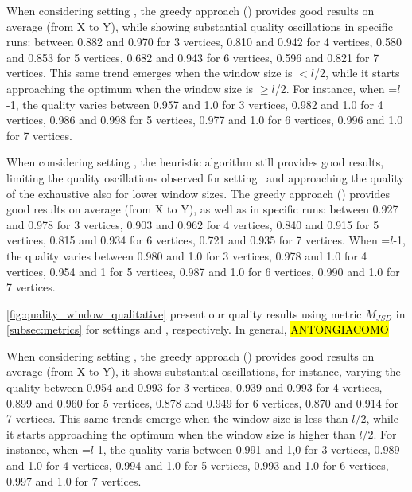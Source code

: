 When considering setting \wide, the greedy approach () provides good results on average (from X to Y), while showing substantial quality oscillations in specific runs: between 0.882 and 0.970 for 3 vertices, 0.810 and 0.942 for 4 vertices, 0.580 and 0.853 for 5 vertices, 0.682 and 0.943 for 6 vertices, 0.596 and 0.821 for 7 vertices. This same trend emerges when the window size is $<$$l$/2, while it starts approaching the optimum when the window size is $\geq$$l$/2. For instance, when \windowsize=$l$-1, the quality varies between 0.957 and 1.0 for 3 vertices, 0.982 and 1.0 for 4 vertices, 0.986 and 0.998 for 5 vertices, 0.977 and 1.0 for 6 vertices, 0.996 and 1.0 for 7 vertices.

When considering setting \average, the heuristic algorithm still provides good results, limiting the quality oscillations observed for setting \wide\ and approaching the quality of the exhaustive also for lower window sizes. The greedy approach () provides good results on average (from X to Y), as well as in specific runs: between 0.927 and 0.978 for 3 vertices, 0.903 and 0.962 for 4 vertices, 0.840 and 0.915 for 5 vertices, 0.815 and 0.934 for 6 vertices, 0.721 and 0.935 for 7 vertices.
When \windowsize=$l$-1, the quality varies between 0.980 and 1.0 for 3 vertices, 0.978 and 1.0 for 4 vertices, 0.954 and 1 for 5 vertices, 0.987 and 1.0 for 6 vertices, 0.990 and 1.0 for 7 vertices.


\cref{fig:quality_window_qualitative} present our quality results using metric $M_{JSD}$ in \cref{subsec:metrics} for settings \wide and \average, respectively.
In general, \hl{ANTONGIACOMO}

When considering setting \wide, the greedy approach () provides good results on average (from X to Y), it shows substantial oscillations, for instance, varying the quality between 0.954 and 0.993 for 3 vertices, 0.939 and 0.993 for 4 vertices, 0.899 and 0.960 for 5 vertices, 0.878 and 0.949 for 6 vertices, 0.870 and 0.914 for 7 vertices. This same trends emerge when the window size is less than $l$/2, while it starts approaching the optimum when the window size is higher than $l$/2. For instance, when \windowsize=$l$-1, the quality varis between  0.991 and  1,0 for 3 vertices, 0.989 and 1.0 for 4 vertices, 0.994 and 1.0 for 5 vertices, 0.993 and 1.0 for 6 vertices, 0.997 and 1.0 for 7 vertices.


